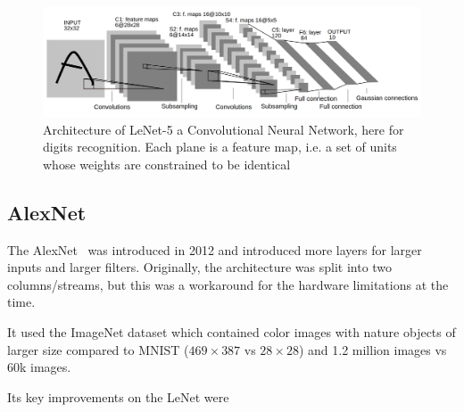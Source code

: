\documentclass[11pt]{article}
\begin{document}
\begin{figure}[H]
    \centering
    \includegraphics[width=\linewidth]{figures/LeNetFigure.png}
    \caption{Architecture of LeNet-5 a Convolutional Neural Network, here for digits recognition. Each plane is a feature map, i.e. a set of units
    whose weights are constrained to be identical~\cite{LeNet}}
\end{figure}




\subsection{AlexNet}

The AlexNet~\cite{AlexNet} was introduced in 2012 and introduced more layers for larger inputs and larger filters. Originally, the architecture was split into two columns/streams, but this was a workaround for the hardware limitations at the time. 

It used the ImageNet dataset which contained color images with nature objects of larger size compared to MNIST ($469\times 387$ vs $28 \times 28$) and 1.2 million images vs 60k images.

Its key improvements on the LeNet were
\end{document}
